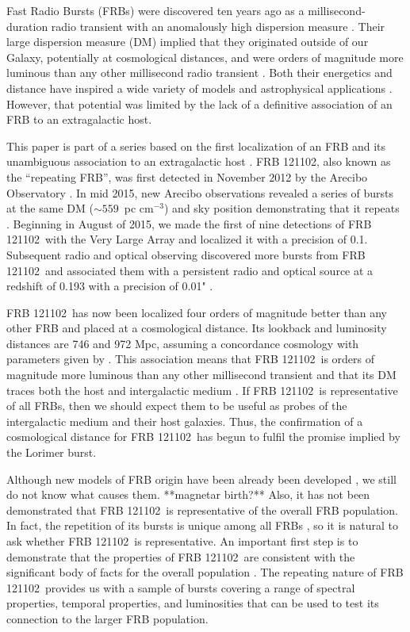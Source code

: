 \documentclass[twocolumn]{aastex61}
\newcommand{\frb}{FRB 121102}
\begin{document}
Fast Radio Bursts (FRBs) were discovered ten years ago as a millisecond-duration radio transient with an anomalously high dispersion measure \citep[the ``Lorimer burst'';][]{2007Sci...318..777L}. Their large dispersion measure (DM) implied that they originated outside of our Galaxy, potentially at cosmological distances, and were orders of magnitude more luminous than any other millisecond radio transient \citep{2013Sci...341...53T}. Both their energetics and distance have inspired a wide variety of models and astrophysical applications \citep[e.g.,][]{2014ApJ...780L..33M, 2014ApJ...797...70K, 2016MNRAS.458L..19C, 2016MNRAS.457..232C}. However, that potential was limited by the lack of a definitive association of an FRB to an extragalactic host.

This paper is part of a series based on the first localization of an FRB and its unambiguous association to an extragalactic host \citep{LOC, OPT, EVN}. \frb, also known as the ``repeating FRB'', was first detected in November 2012 by the Arecibo Observatory \citep{2014ApJ...790..101S}. In mid 2015, new Arecibo observations revealed a series of bursts at the same DM ($\sim559$\ pc cm$^{-3}$) and sky position demonstrating that it repeats \citep{2016Natur.531..202S}. Beginning in August of 2015, we made the first of nine detections of \frb\ with the Very Large Array \citep{LOC} and localized it with a precision of 0.1\arcsec. Subsequent radio and optical observing discovered more bursts from \frb\ and associated them with a persistent radio and optical source at a redshift of 0.193 with a precision of 0.01" \citep[$\sim40$\ pc]{OPT, EVN}.

\frb\ has now been localized four orders of magnitude better than any other FRB and placed at a cosmological distance. Its lookback and luminosity distances are 746 and 972 Mpc, assuming a concordance cosmology with parameters given by \citet{2016A&A...594A..13P}. This association means that \frb\ is orders of magnitude more luminous than any other millisecond transient and that its DM traces both the host and intergalactic medium \citep{OPT}. If \frb\ is representative of all FRBs, then we should expect them to be useful as probes of the intergalactic medium and their host galaxies. Thus, the confirmation of a cosmological distance for \frb\ has begun to fulfil the promise implied by the Lorimer burst.

Although new models of FRB origin have been already been developed \citep{2017arXiv170104815K, 2017arXiv170102370M, 2017arXiv170104094Z, 2017arXiv170102492D}, we still do not know what causes them. 
**magnetar birth?**
Also, it has not been demonstrated that \frb\ is representative of the overall FRB population. In fact, the repetition of its bursts is unique among all FRBs \citep{2015MNRAS.454..457P}, so it is natural to ask whether \frb\ is representative. An important first step is to demonstrate that the properties of \frb\ are consistent with the significant body of facts for the overall population \citep{2015MNRAS.451.3278M, 2016MPLA...3130013K}. The repeating nature of \frb\ provides us with a sample of bursts covering a range of spectral properties, temporal properties, and luminosities that can be used to test its connection to the larger FRB population.
\end{document}
